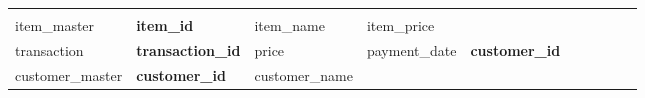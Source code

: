 \documentclass[11pt]{article}
\begin{document}
\begin{longtable}[]{@{}llllllllll@{}}
\begin{minipage}[t]{0.03\columnwidth}
\strut
\end{minipage}\tabularnewline
\begin{minipage}[t]{0.03\columnwidth}\raggedright\strut
item\_master\strut
\end{minipage} & \begin{minipage}[t]{0.03\columnwidth}\raggedright\strut
\textbf{item\_id}\strut
\end{minipage} & \begin{minipage}[t]{0.03\columnwidth}\raggedright\strut
item\_name\strut
\end{minipage} & \begin{minipage}[t]{0.03\columnwidth}\raggedright\strut
item\_price\strut
\end{minipage} & \begin{minipage}[t]{0.03\columnwidth}\raggedright\strut
\strut
\end{minipage}\tabularnewline
\begin{minipage}[t]{0.03\columnwidth}\raggedright\strut
transaction\strut
\end{minipage} & \begin{minipage}[t]{0.03\columnwidth}\raggedright\strut
\textbf{transaction\_id}\strut
\end{minipage} & \begin{minipage}[t]{0.03\columnwidth}\raggedright\strut
price\strut
\end{minipage} & \begin{minipage}[t]{0.03\columnwidth}\raggedright\strut
payment\_date\strut
\end{minipage} & \begin{minipage}[t]{0.03\columnwidth}\raggedright\strut
\textbf{customer\_id}\strut
\end{minipage} & \begin{minipage}[t]{0.03\columnwidth}\raggedright\strut
\strut
\end{minipage}\tabularnewline
\begin{minipage}[t]{0.03\columnwidth}\raggedright\strut
customer\_master\strut
\end{minipage} & \begin{minipage}[t]{0.03\columnwidth}\raggedright\strut
\textbf{customer\_id}\strut
\end{minipage} & \begin{minipage}[t]{0.03\columnwidth}\raggedright\strut
customer\_name\strut
\end{minipage} & \begin{minipage}[t]{0.03\columnwidth}\raggedright\strut

\end{minipage}
\end{longtable}
\end{document}
